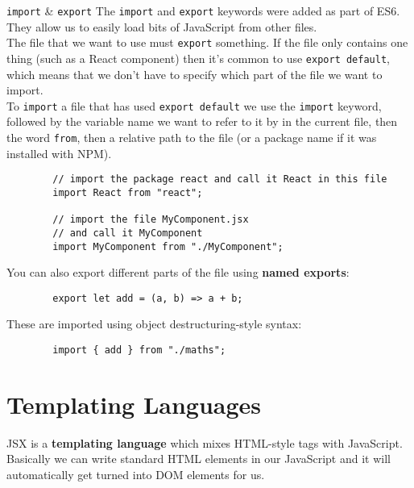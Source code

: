 \begin{infobox}{\texttt{import} \& \texttt{export}}
    The \texttt{import} and \texttt{export} keywords were added as part of ES6. They allow us to easily load bits of JavaScript from other files.
    \\

    The file that we want to use must \texttt{export} something. If the file only contains one thing (such as a React component) then it's common to use \texttt{export default}, which means that we don't have to specify which part of the file we want to import.
    \\

    To \texttt{import} a file that has used \texttt{export default} we use the \texttt{import} keyword, followed by the variable name we want to refer to it by in the current file, then the word \texttt{from}, then a relative path to the file (or a package name if it was installed with NPM).

    \begin{verbatim}
        // import the package react and call it React in this file
        import React from "react";

        // import the file MyComponent.jsx
        // and call it MyComponent
        import MyComponent from "./MyComponent";
    \end{verbatim}

    You can also export different parts of the file using \textbf{named exports}:

    \begin{verbatim}
        export let add = (a, b) => a + b;
    \end{verbatim}

    These are imported using object destructuring-style syntax:

    \begin{verbatim}
        import { add } from "./maths";
    \end{verbatim}
\end{infobox}


\section{Templating Languages}

JSX is a \textbf{templating language} which mixes HTML-style tags with JavaScript. Basically we can write standard HTML elements in our JavaScript and it will automatically get turned into DOM elements for us.
\\

